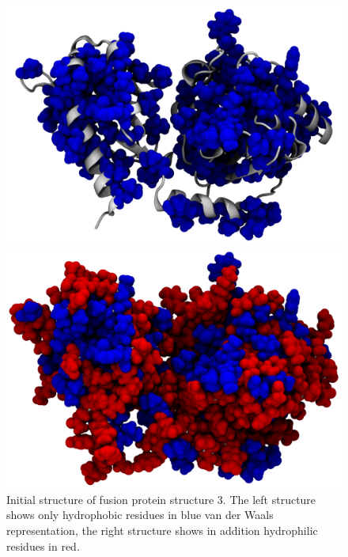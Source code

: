 \documentclass[english, a4paper, 12pt, titlepage, draft]{article}
\begin{document}

\begin{figure}
    \begin{minipage}[]{0.45\linewidth}
        \centering
        \includegraphics[width=\textwidth]{figures/Complex_hydrophobic_core/hydrophobic_core_linker.png}
    \end{minipage}
\hspace{0.5cm}
    \begin{minipage}[]{0.45\linewidth}
        \centering
        \includegraphics[width=\textwidth]{figures/Complex_hydrophobic_core/protein.png}
    \end{minipage}
    \caption{Initial structure of fusion protein structure 3. The left structure shows only hydrophobic residues in blue van der Waals representation, the right structure shows in addition hydrophilic residues in red.}
    \label{fig:hydrophobic_core}
\end{figure}     
\end{document}
